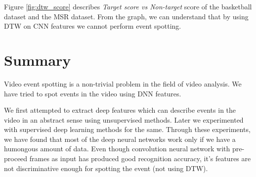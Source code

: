 Figure \ref{fig:dtw_score} describes \textit{Target score vs Non-target} score of the basketball dataset and the MSR dataset.  From the graph, we can understand that by using DTW on CNN features we cannot perform event spotting.

\section{Summary}

Video event spotting is a non-trivial problem in the field of video analysis.  We have tried to spot events in the video using DNN features.

We first attempted to extract deep features which can describe events in the video in an abstract sense using unsupervised methods.  Later we experimented with supervised deep learning methods for the same.  Through these experiments, we have found that most of the deep neural networks work only if we have a humongous amount of data.  Even though convolution neural network with pre-proceed frames as input has produced good recognition accuracy, it's features are not discriminative enough for spotting the event (not using DTW).